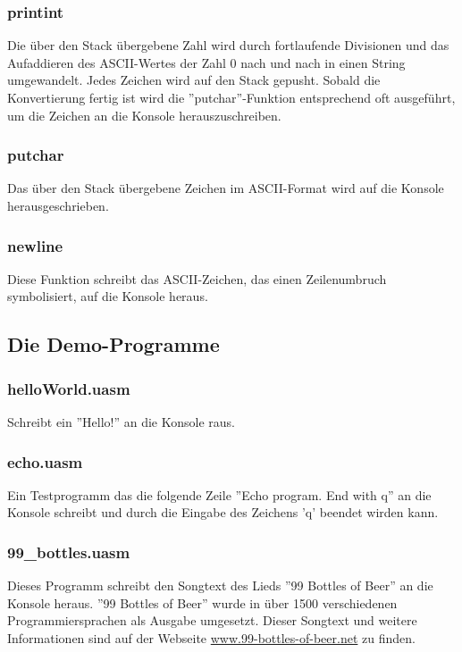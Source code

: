 \subsubsection{printint}
Die über den Stack übergebene Zahl wird durch fortlaufende Divisionen und das
Aufaddieren des ASCII-Wertes der Zahl 0 nach und nach in einen String
umgewandelt. Jedes Zeichen wird auf den Stack gepusht. Sobald die Konvertierung
fertig ist wird die ''putchar''-Funktion entsprechend oft ausgeführt, um die
Zeichen an die Konsole herauszuschreiben.

\subsubsection{putchar}
Das über den Stack übergebene Zeichen im ASCII-Format wird auf die Konsole 
herausgeschrieben.

\subsubsection{newline}
Diese Funktion schreibt das ASCII-Zeichen, das einen Zeilenumbruch symbolisiert,
auf die Konsole heraus.


\subsection{Die Demo-Programme}

\subsubsection{helloWorld.uasm}
Schreibt ein ''Hello!'' an die Konsole raus.

\subsubsection{echo.uasm}
Ein Testprogramm das die folgende Zeile ''Echo program. End with q'' an die 
Konsole schreibt und durch die Eingabe des Zeichens 'q' beendet wirden kann.

\subsubsection{99\_bottles.uasm}
Dieses Programm schreibt den Songtext des Lieds ''99 Bottles of Beer'' an die 
Konsole heraus. ''99 Bottles of Beer'' wurde in über 1500 verschiedenen
Programmiersprachen als Ausgabe umgesetzt. Dieser Songtext und weitere
Informationen sind auf der Webseite \url{www.99-bottles-of-beer.net} zu
finden.

